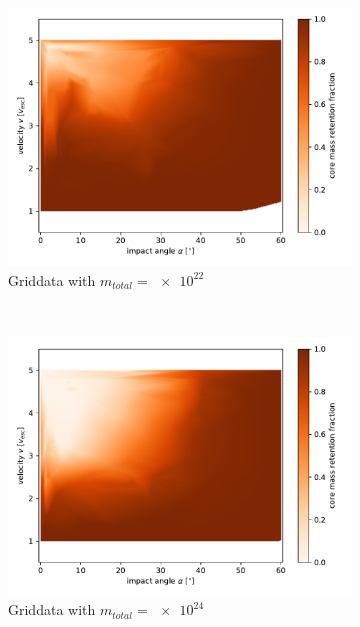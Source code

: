 \begin{figure}
	\centering
	\begin{subfigure}[t]{0.5\textwidth}
		\centering
		\includegraphics[width=\linewidth]{images/plots/mass_griddata1.pdf}
		\caption{Griddata with $m_{total}=\num{e22}$}
		\label{fig:mass_griddata1}
	\end{subfigure}%
	~ 
	\begin{subfigure}[t]{0.5\textwidth}
		\centering
		\includegraphics[width=\linewidth]{images/plots/mass_griddata2.pdf}
		\caption{Griddata with $m_{total}=\num{e24}$}
		\label{fig:mass_griddata2}
	\end{subfigure}
~ 
	\begin{subfigure}[t]{0.5\textwidth}

\end{subfigure}
\end{figure}

